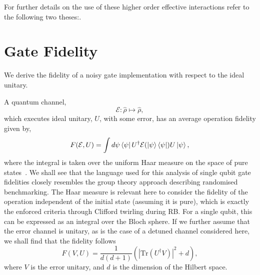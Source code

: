     For further details on the use of these higher order effective interactions refer to the following two theses:\cite{bazavan_easy_2024,saner_quantum_2026}.


\section{Gate Fidelity}
\label{sec:fidelity}
We derive the fidelity of a noisy gate implementation with respect to the ideal unitary.

A quantum channel,
\begin{equation}
    \mathcal{E}: \hat\rho \mapsto \hat\rho,
\end{equation}
which executes ideal unitary, $U$, with some error, has 
an average operation fidelity given by, 
\begin{equation}
    \label{eqn:fid}
    F(\mathcal{E},U) = \int d\psi \bra{\psi} U^\dagger \mathcal{E}(\ket{\psi}\bra{\psi}) U \ket{\psi},
\end{equation}
where the integral is taken over the uniform Haar measure on the space of pure states~\cite{bowdrey_fidelity_2002, nielsen_simple_2002}. We shall see that the language used for this analysis of single qubit gate fidelities closely resembles the group theory approach describing randomised benchmarking. The Haar measure is relevant here to consider the fidelity of the operation independent of the initial state (assuming it is pure), which is exactly the enforced criteria through Clifford twirling during RB. For a single qubit, this can be expressed as an integral over the Bloch sphere. 
If we further assume that the error channel is unitary, as is the case of a detuned channel considered here, we shall find that the fidelity follows
\begin{equation}
    \label{eqn:fid_unitary}
    F(V,U) = \frac{1}{d(d+1)} \left( |\text{Tr}(U^\dagger V)|^2 + d \right),
\end{equation}
 where $V$ is the error unitary, and $d$ is the dimension of the Hilbert space. 

